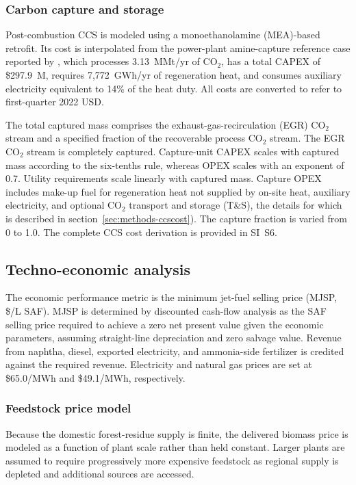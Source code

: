 \subsubsection{Carbon capture and storage}\label{sec:methods-ccs}

Post-combustion CCS is modeled using a monoethanolamine (MEA)-based retrofit. Its cost is interpolated from the power-plant amine-capture reference case reported by \cite{rao2002technical}, which processes 3.13~MMt/yr of CO$_2$, has a total CAPEX of \$297.9~M, requires 7,772~GWh/yr of regeneration heat, and consumes auxiliary electricity equivalent to 14\% of the heat duty. All costs are converted to refer to first-quarter 2022 USD.

The total captured mass comprises the exhaust-gas-recirculation (EGR) CO$_2$ stream and a specified fraction of the recoverable process CO$_2$ stream. The EGR CO$_2$ stream is completely captured. Capture-unit CAPEX scales with captured mass according to the six-tenths rule, whereas OPEX scales with an exponent of 0.7. Utility requirements scale linearly with captured mass. Capture OPEX includes make-up fuel for regeneration heat not supplied by on-site heat, auxiliary electricity, and optional CO$_2$ transport and storage (T\&S), the details for which is described in section~\ref{sec:methods-ccscost}). The capture fraction is varied from 0 to 1.0. The complete CCS cost derivation is provided in SI~S6.

\subsection{Techno-economic analysis}\label{sec:methods-tea}

The economic performance metric is the minimum jet-fuel selling price (MJSP,  \$/L SAF). MJSP is determined by discounted cash-flow analysis as the SAF selling price required to achieve a zero net present value given the economic parameters, assuming straight-line depreciation and zero salvage value.
Revenue from naphtha, diesel, exported electricity, and ammonia-side fertilizer is credited against the required revenue. Electricity and natural gas prices are set at \$65.0/MWh and \$49.1/MWh, respectively.

\subsubsection{Feedstock price model}\label{sec:methods-feed}

Because the domestic forest-residue supply is finite, the delivered biomass price is modeled as a function of plant scale rather than held constant. Larger plants are assumed to require progressively more expensive feedstock as regional supply is depleted and additional sources are accessed. 

